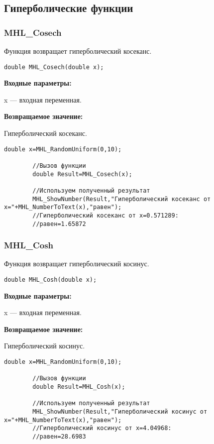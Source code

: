 \documentclass[a4paper,12pt]{article}
\begin{document}
\subsection{Гиперболические функции}

\subsubsection{MHL\_Cosech}\label{MHL_Cosech}

Функция возвращает гиперболический косеканс.


\begin{lstlisting}[label=code_syntax_MHL_Cosech,caption=Синтаксис]
double MHL_Cosech(double x);
\end{lstlisting}

\textbf{Входные параметры:}

 x --- входная переменная.

\textbf{Возвращаемое значение:}

Гиперболический косеканс.


\begin{lstlisting}[label=code_use_MHL_Cosech,caption=Пример использования]
        double x=MHL_RandomUniform(0,10);

        //Вызов функции
        double Result=MHL_Cosech(x);

        //Используем полученный результат
        MHL_ShowNumber(Result,"Гиперболический косеканс от x="+MHL_NumberToText(x),"равен");
        //Гиперболический косеканс от x=0.571289:
        //равен=1.65872
\end{lstlisting}

\subsubsection{MHL\_Cosh}\label{MHL_Cosh}

Функция возвращает гиперболический косинус.


\begin{lstlisting}[label=code_syntax_MHL_Cosh,caption=Синтаксис]
double MHL_Cosh(double x);
\end{lstlisting}

\textbf{Входные параметры:}

 x --- входная переменная.

\textbf{Возвращаемое значение:}

Гиперболический косинус.


\begin{lstlisting}[label=code_use_MHL_Cosh,caption=Пример использования]
        double x=MHL_RandomUniform(0,10);

        //Вызов функции
        double Result=MHL_Cosh(x);

        //Используем полученный результат
        MHL_ShowNumber(Result,"Гиперболический косинус от x="+MHL_NumberToText(x),"равен");
        //Гиперболический косинус от x=4.04968:
        //равен=28.6983
\end{lstlisting}
\end{document}
